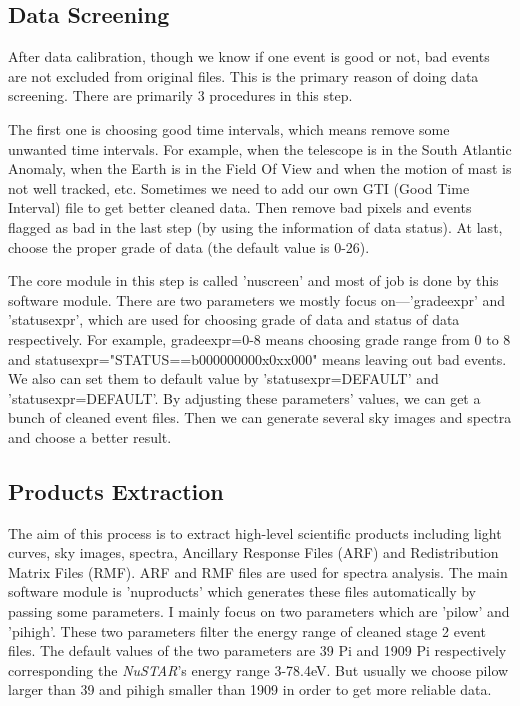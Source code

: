 \documentclass[12pt]{report}
\begin{document}
            
            \subsection{Data Screening}  
              After data calibration, though we know if one event is good or not, bad events are not excluded from 
              original
              files. This is the primary reason of doing data screening. There are primarily 3 procedures in this 
              step.

              \indent The first one is choosing good time intervals, which means remove some unwanted time 
              intervals. For 
              example, when the telescope is in the South Atlantic Anomaly, when the Earth is in the Field Of 
              View and 
              when the motion of mast is not well tracked, etc. Sometimes we need to add our own GTI (Good Time 
              Interval) file to get better cleaned data. 
              Then remove bad pixels and events flagged as 
              bad in the 
              last step (by using the information of data status). At last, choose the proper grade of data 
              (the default value is 0-26). 

              \indent The core module in this step is called 'nuscreen' and most of job is done by this software 
              module.  
              There are two parameters we mostly focus on---'gradeexpr' and 'statusexpr', which are used for choosing 
              grade of data and status of data respectively. For example, gradeexpr=0-8 means choosing grade range 
              from 0 to 8 and statusexpr="STATUS==b000000000x0xx000" means leaving out bad events. We also can set  
              them to default value by 'statusexpr=DEFAULT' and 'statusexpr=DEFAULT'. By adjusting these parameters' 
              values, we can get a bunch of cleaned event files. Then we can generate several sky images and 
              spectra and 
              choose a better result. 

             \subsection{Products Extraction}
              The aim of this process is to extract high-level scientific products including light curves, sky images,
              spectra, Ancillary Response Files (ARF) and Redistribution Matrix Files (RMF). ARF and RMF files are 
              used for spectra analysis. The main software module is 'nuproducts' which generates these files 
              automatically by 
              passing some parameters. I mainly focus on two parameters which are 'pilow' and 'pihigh'. These two 
              parameters filter the energy range of cleaned stage 2 event files. The default values of the two 
              parameters
              are 39 Pi and 1909 Pi respectively corresponding the \textit{NuSTAR}'s energy range 3-78.4eV. But 
              usually we 
              choose pilow larger than 39 and pihigh smaller than 1909 in order to get more reliable data.
\end{document}

